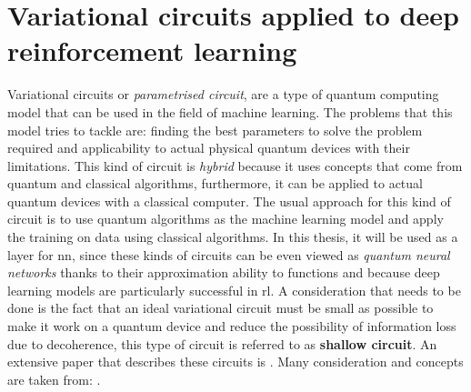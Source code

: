 \section{Variational circuits applied to deep reinforcement learning}
Variational circuits or \textit{parametrised circuit}, are a type of quantum computing model that can be used in the field of machine learning. The problems that this model tries to tackle are: finding the best parameters to solve the problem required and applicability to actual physical quantum devices with their limitations. This kind of circuit is \textit{hybrid} because it uses concepts that come from quantum and classical algorithms, furthermore, it can be applied to actual quantum devices with a classical computer. The usual approach for this kind of circuit is to use quantum algorithms as the machine learning model and apply the training on data using classical algorithms. In this thesis, it will be used as a layer for \acrfull{nn}, since these kinds of circuits can be even viewed as \textit{quantum neural networks} thanks to their approximation ability to functions and because deep learning models are particularly successful in \acrfull{rl}. A consideration that needs to be done is the fact that an ideal variational circuit must be small as possible to make it work on a quantum device and reduce the possibility of information loss due to decoherence, this type of circuit is referred to as \textbf{shallow circuit}. An extensive paper that describes these circuits is \cite{Cerezo_2021}. Many consideration and concepts are taken from: \cite{Schuld2021vqa}.
